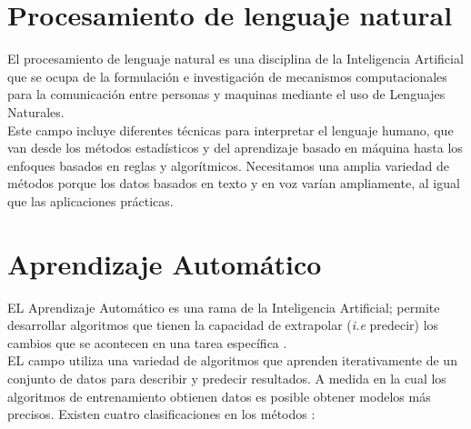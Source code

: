 
\section[Procesamiento de LN]{Procesamiento de lenguaje natural}

El procesamiento de lenguaje natural es una disciplina de la Inteligencia Artificial que se ocupa de la formulación e 
investigación de mecanismos computacionales para la comunicación entre personas y maquinas mediante el uso de Lenguajes 
Naturales.\\

Este campo incluye diferentes técnicas para interpretar el lenguaje humano, que van desde los métodos 
estadísticos y del aprendizaje basado en máquina hasta los enfoques basados en reglas y algorítmicos. Necesitamos una amplia variedad 
de métodos porque los datos basados en texto y en voz varían ampliamente, al igual que las aplicaciones prácticas. 


\section{Aprendizaje Automático}

EL Aprendizaje Automático es una rama de la Inteligencia Artificial; permite desarrollar algoritmos que tienen la capacidad de extrapolar (\textit{i.e} predecir) los cambios que se acontecen en una tarea específica \citep{CT2}.\\

EL campo utiliza una variedad de algoritmos que aprenden iterativamente de un conjunto de
datos para describir y predecir resultados. A medida en la cual los algoritmos de 
entrenamiento obtienen datos es posible obtener modelos más precisos. Existen cuatro clasificaciones en los métodos \citep{CT21}:

